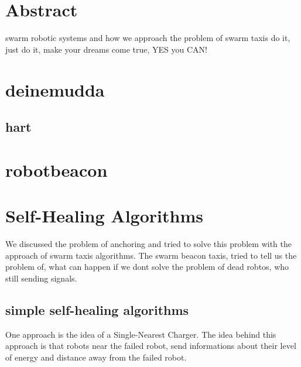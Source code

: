 \documentclass[
	a4paper,
	article,
	pagesize,
	pdftex,
	12pt,
	twoside, %
	BCOR=5mm, %
	english,
	fleqn,
	final,
	]{scrartcl}
\begin{document}

\makeTitel

\tableofcontents
\clearpage

\section{Abstract}
swarm robotic systems and how we approach the problem of swarm taxis
do it, just do it, make your dreams come true, YES you CAN!
	 
\clearpage

\section{deinemudda}
\subsection{hart}
\section{robotbeacon}
\clearpage

\section{Self-Healing Algorithms}
We discussed the problem of anchoring and tried to solve this problem with the approach of swarm taxis algorithms. The swarm beacon taxis, tried to tell us the problem of, what can happen if we dont solve the problem of dead robtos, who still sending signals.

\subsection{simple self-healing algorithms}
One approach is the idea of a Single-Nearest Charger.
The idea behind this approach is that robots near the failed robot, send informations about their level of energy and distance away from the failed robot.
\newline
\end{document}
